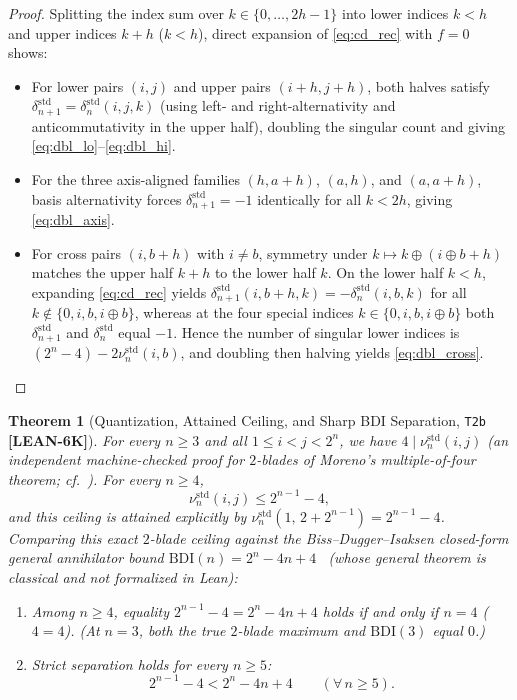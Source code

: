 \documentclass[11pt,reqno]{amsart}
\theoremstyle{plain}
\newtheorem{theorem}{Theorem}[section]
\theoremstyle{definition}
\theoremstyle{remark}
\newcommand{\tagLean}{\mbox{\textsf{\textbf{\color{oiBlue}[LEAN-6K]}}}}
\newcommand{\std}{\mathrm{std}}
\begin{document}
\begin{proof}
Splitting the index sum over $k \in \{0, \dots, 2h-1\}$ into lower indices $k < h$ and upper
indices $k + h$ ($k < h$), direct expansion of \eqref{eq:cd_rec} with $f = 0$ shows:
\begin{itemize}[leftmargin=2em]
  \item For lower pairs $(i, j)$ and upper pairs $(i+h, j+h)$, both halves satisfy
    $\delta_{n+1}^{\std} = \delta_n^{\std}(i, j, k)$ (using left- and right-alternativity and
    anticommutativity in the upper half), doubling the singular count and giving
    \eqref{eq:dbl_lo}--\eqref{eq:dbl_hi}.
  \item For the three axis-aligned families $(h, a+h)$, $(a, h)$, and $(a, a+h)$, basis
    alternativity forces $\delta_{n+1}^{\std} = -1$ identically for all $k < 2h$, giving
    \eqref{eq:dbl_axis}.
  \item For cross pairs $(i, b+h)$ with $i \neq b$, symmetry under $k \mapsto k \oplus (i \oplus b + h)$
    matches the upper half $k + h$ to the lower half $k$. On the lower half $k < h$, expanding
    \eqref{eq:cd_rec} yields $\delta_{n+1}^{\std}(i, b+h, k) = -\delta_n^{\std}(i, b, k)$ for
    all $k \notin \{0, i, b, i \oplus b\}$, whereas at the four special indices
    $k \in \{0, i, b, i \oplus b\}$ both $\delta_{n+1}^{\std}$ and $\delta_n^{\std}$ equal $-1$.
    Hence the number of singular lower indices is $(2^n - 4) - 2\nu_n^{\std}(i, b)$, and
    doubling then halving yields \eqref{eq:dbl_cross}.\qedhere
\end{itemize}
\end{proof}

\begin{theorem}[Quantization, Attained Ceiling, and Sharp BDI Separation, \texttt{T2b} \tagLean]
\label{thm:t2b}
For every $n \ge 3$ and all $1 \le i < j < 2^n$, we have $4 \mid \nu_n^{\std}(i, j)$
(an independent machine-checked proof for $2$-blades of Moreno's multiple-of-four theorem;
cf.~\cite{moreno1998,biss2008i}). For every $n \ge 4$,
\begin{equation}
  \nu_n^{\std}(i, j) \le 2^{n-1} - 4,
\end{equation}
and this ceiling is \emph{attained} explicitly by $\nu_n^{\std}(1,\, 2 + 2^{n-1}) = 2^{n-1} - 4$.
Comparing this exact $2$-blade ceiling against the Biss--Dugger--Isaksen closed-form general
annihilator bound $\mathrm{BDI}(n) = 2^n - 4n + 4$~\cite{biss2008i} (whose general theorem is
classical and not formalized in Lean):
\begin{enumerate}[leftmargin=2em]
  \item Among $n \ge 4$, equality $2^{n-1} - 4 = 2^n - 4n + 4$ holds \emph{if and only if}
    $n = 4$ ($4 = 4$). (At $n = 3$, both the true $2$-blade maximum and $\mathrm{BDI}(3)$ equal $0$.)
  \item Strict separation holds for every $n \ge 5$:
    \begin{equation}
      2^{n-1} - 4 < 2^n - 4n + 4 \qquad (\forall\, n \ge 5).
    \end{equation}
\end{enumerate}
\end{theorem}
\end{document}
